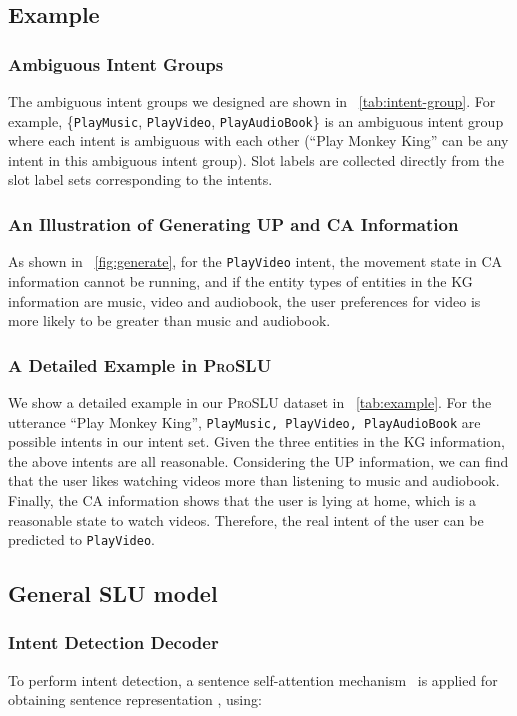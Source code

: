 \documentclass[letterpaper]{article} \usepackage{aaai22}  \usepackage{times}  \usepackage{helvet}  \usepackage{courier}  \usepackage[hyphens]{url}  \usepackage{graphicx} \urlstyle{rm} \def\UrlFont{\rm}  \usepackage{natbib}  \usepackage{caption} \DeclareCaptionStyle{ruled}{labelfont=normalfont,labelsep=colon,strut=off} \frenchspacing  \setlength{\pdfpagewidth}{8.5in}  \setlength{\pdfpageheight}{11in}  \usepackage{algorithm}
\begin{document}
\subsection{Example}
\label{appendix:example}
\subsubsection{Ambiguous Intent Groups}
The ambiguous intent groups we designed are shown in \tablename~\ref{tab:intent-group}. 
For example, \{\texttt{PlayMusic}, \texttt{PlayVideo}, \texttt{PlayAudioBook}\} is an ambiguous intent group where each intent is ambiguous with each other (``Play Monkey King'' can be any intent in this ambiguous intent group).
Slot labels are collected directly from the slot label sets corresponding to the intents.

\subsubsection{An Illustration of Generating UP and CA Information}
As shown in \figurename~\ref{fig:generate}, for the \texttt{PlayVideo} intent, the movement state in CA information cannot be running, and if the entity types of entities in the KG information are music, video and audiobook,
the user preferences for video is more likely to be greater than music and audiobook.

\subsubsection{A Detailed Example in \textsc{ProSLU}}
We show a detailed example in our \textsc{ProSLU} dataset in \tablename~\ref{tab:example}. 
For the utterance ``Play Monkey King'', \texttt{PlayMusic, PlayVideo, PlayAudioBook} are possible intents in our intent set. 
Given the three entities in the KG information, the above intents are all reasonable. 
Considering the UP information, we can find that the user likes watching videos more than listening to music and audiobook. Finally, the CA information shows that the user is lying at home, which is a reasonable state to watch videos. Therefore, the real intent of the user can be predicted to \texttt{PlayVideo}.

\subsection{General SLU model}
\label{appendix:general-slu-model}
\subsubsection{Intent Detection Decoder}
To perform intent detection, a sentence self-attention mechanism~\citep{zhong-etal-2018-global} is applied for obtaining sentence representation , using:
\end{document}
